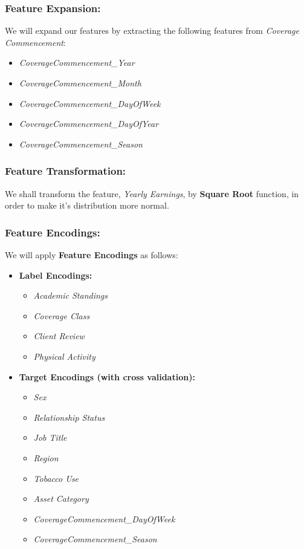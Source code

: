 \documentclass[a4paper,12pt]{article}
\begin{document}
\subsubsection{Feature Expansion:}
We will expand our features by extracting the following features from \textit{Coverage Commencement}:
\begin{itemize}
    \item \textit{CoverageCommencement\_Year}
    \item \textit{CoverageCommencement\_Month}
    \item \textit{CoverageCommencement\_DayOfWeek}
    \item \textit{CoverageCommencement\_DayOfYear}
    \item \textit{CoverageCommencement\_Season}
\end{itemize}

\subsubsection{Feature Transformation:}
We shall transform the feature, \textit{Yearly Earnings}, by \textbf{Square Root} function, in order to make it's distribution more normal.

\subsubsection{Feature Encodings:}
We will apply \textbf{Feature Encodings} as follows:
\begin{itemize}
    \item \textbf{Label Encodings:}
    \begin{itemize}
        \item \textit{Academic Standings}
        \item \textit{Coverage Class}
        \item \textit{Client Review}
        \item \textit{Physical Activity}
    \end{itemize}
    
    \item \textbf{Target Encodings (with cross validation):}
    \begin{itemize}
        \item \textit{Sex}
        \item \textit{Relationship Status}
        \item \textit{Job Title}
        \item \textit{Region}
        \item \textit{Tobacco Use}
        \item \textit{Asset Category}
        \item \textit{CoverageCommencement\_DayOfWeek}
        \item \textit{CoverageCommencement\_Season}
    \end{itemize}
\end{itemize}
\end{document}
